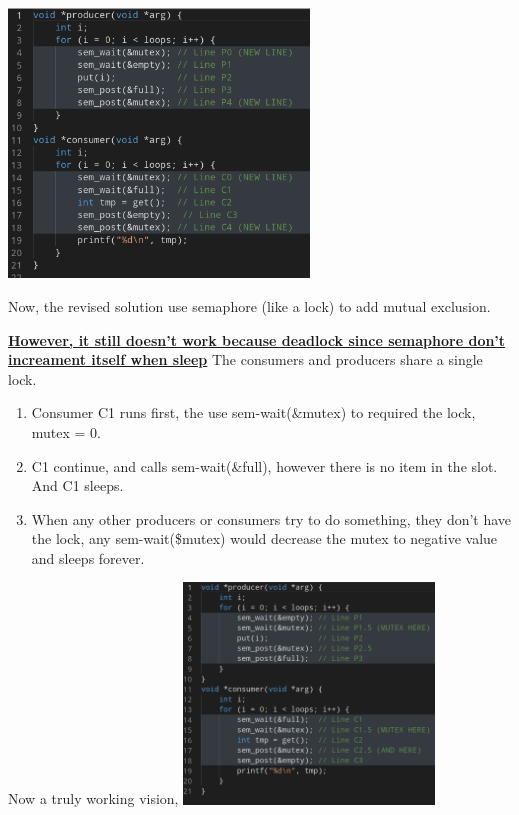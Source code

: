     \includegraphics[width=0.6\textwidth]{chapters/Cucurrency/Cucurrency/revised_pc_semaphore.png}

    Now, the revised solution use semaphore (like a lock) to add mutual exclusion.

    \underline{\textbf{However, it still doesn't work because deadlock since semaphore don't increament itself when sleep}} The consumers 
    and producers share a single lock.

    \begin{enumerate}
        \item Consumer C1 runs first, the use sem-wait(\&mutex) to required the lock, mutex = 0.
        \item C1 continue, and calls sem-wait(\&full), however there is no item in the 
        slot. And C1 sleeps.
        \item When any other producers or consumers try to do something, they don't have the lock,
        any sem-wait(\$mutex) would decrease the mutex to negative value and sleeps forever.
    \end{enumerate}

    Now a truly working vision,
    \includegraphics[width=0.5\textwidth]{chapters/Cucurrency/Cucurrency/true_revised_pc_semaphore.png}

